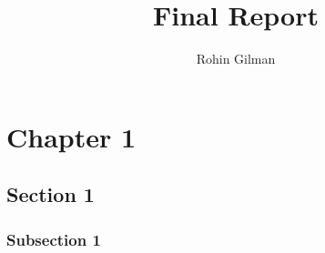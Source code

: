 \documentclass{report}
\title{Final Report}
\author{Rohin Gilman}
\date{}
\begin{document}
\maketitle

\chapter{Chapter 1}
\section{Section 1}
\subsection{Subsection 1}
\end{document}
